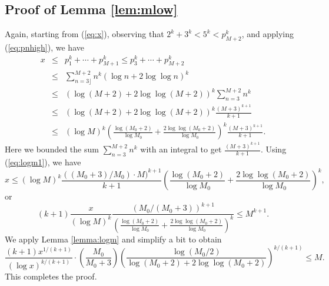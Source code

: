 \documentclass[11pt]{amsart}
\numberwithin{equation}{section}
\numberwithin{algorithm}{section}
\begin{document}



\subsection{Proof of Lemma \ref{lem:mlow}}

Again, starting from (\ref{eq:x}),
observing that $2^k+3^k<5^k<p_{M+2}^k$, and applying (\ref{eq:pnhigh}), we have
\begin{eqnarray*}
    x &\le& p_1^k+\cdots+p_{M+1}^k 
    \le p_3^k+\cdots+p_{M+2}^k \\
    &\le&  \sum_{n=3 \rfloor}^{M+2}
      n^k ( \log n + 2\log\log n)^k \\
    &\le& (\log (M+2) + 2\log\log (M+2))^k
      \sum_{n=3}^{M+2} n^k \\
    &\le& (\log (M+2) + 2\log\log (M+2))^k 
      \frac{(M+3)^{k+1}}{k+1} \\
    &\le&  (\log M)^k 
    \left( \frac{\log(M_0+2)}{\log M_0}+\frac{2\log\log(M_0+2)}{\log M_0}\right)^k
    \frac{(M+3)^{k+1}}{k+1}.
\end{eqnarray*}
Here we bounded the sum $\sum_{n=3}^{M+2} n^k$
with an integral to get $\frac{(M+3)^{k+1}}{k+1}$.
Using (\ref{eq:logm1}), we have
$$
x \le ( \log M )^k \frac{((M_0+3)/M_0)\cdot M)^{k+1}}{k+1}
\left( \frac{\log(M_0+2)}{\log M_0}+\frac{2\log\log(M_0+2)}{\log M_0}\right)^k,
$$
or
$$
(k+1) \frac{x}{(\log M)^k} 
\frac{(M_0/(M_0+3))^{k+1}}{ \left( \frac{\log(M_0+2)}{\log M_0}+\frac{2\log\log(M_0+2)}{\log M_0}\right)^k}
\le M^{k+1}.
$$
We apply Lemma \ref{lemma:logm} and simplify a bit to obtain
$$
 \frac{(k+1) x^{1/(k+1)}}{(\log x)^{k/(k+1)}} \cdot
 \left(\frac{M_0}{M_0+3}\right)
 \left(\frac{\log(M_0/2)}{\log( M_0+2) + 2\log\log(M_0+2)}\right)^{k/(k+1)}
 \le M.
$$
This completes the proof.
\end{document}
